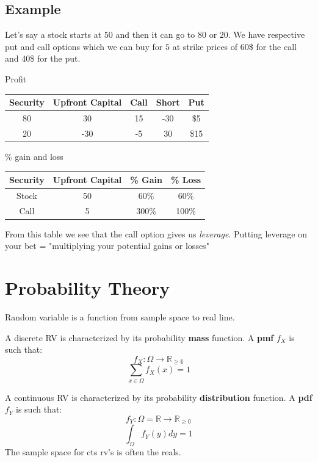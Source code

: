 \documentclass{article}
\begin{document}
\subsection{Example}

Let's say a stock starts at $50$ and then it can go to $80$ or $20$. We have respective put and call options which we can buy for $5$ at strike prices of 60\$ for the call and 40\$ for the put. 

\begin{center}
Profit
\begin{tabular}{||c c c c c||} 
 \hline
 Security & Upfront Capital & Call & Short & Put\\ [0.5ex] 
 \hline
 \hline
 80 & 30 & 15 & -30  & \$5 \\ 
 \hline
 20 & -30 & -5 & 30 & \$15 \\
 \hline
\end{tabular}
\end{center}

\begin{center}
\% gain and loss
\begin{tabular}{||c c c c||} 
 \hline
 Security & Upfront Capital & \% Gain & \% Loss \\ [0.5ex] 
 \hline
 \hline
 Stock & 50 & 60\% & 60\% \\ 
 \hline
 Call & 5 & 300\% & 100\% \\
 \hline
\end{tabular}
\end{center}

From this table we see that the call option gives us \textit{leverage}. Putting leverage on your bet = "multiplying your potential gains or losses"


\section{Probability Theory}
Random variable is a function from sample space to real line. 

A discrete RV is characterized by its probability \textbf{mass} function. A \textbf{pmf} $f_X$ is such that:
\[f_X : \Omega \rightarrow \mathbb{R_{\geq 0}} \]
\[\sum_{x \in \Omega} f_X(x)=1 \]


A continuous RV is characterized by its probability \textbf{distribution} function. A \textbf{pdf} $f_Y$ is such that:
\[f_Y : \Omega=\mathbb{R} \rightarrow \mathbb{R_{\geq 0}} \]
\[\int_{\Omega} f_Y(y) dy =1 \]
The sample space for cts rv's is often the reals. 
\end{document}
